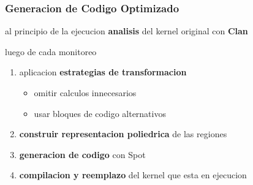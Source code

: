 \documentclass{beamer}\usetheme{Madrid} %
\begin{document}
\begin{frame}
\frametitle{Generacion de Codigo Optimizado}
\begin{block}{al principio de la ejecucion}
\textbf{analisis} del kernel original con \textbf{Clan}
\end{block}
\begin{block}{luego de cada monitoreo}
\begin{enumerate}
\item aplicacion \textbf{estrategias de transformacion}
\begin{itemize}
	\item omitir calculos innecesarios
	\item usar bloques de codigo alternativos
\end{itemize}
\item \textbf{construir representacion poliedrica} de las regiones
\item \textbf{generacion de codigo} con Spot
\item \textbf{compilacion y reemplazo} del kernel que esta en ejecucion
\end{enumerate}
\end{block}
\end{frame}
\end{document}
